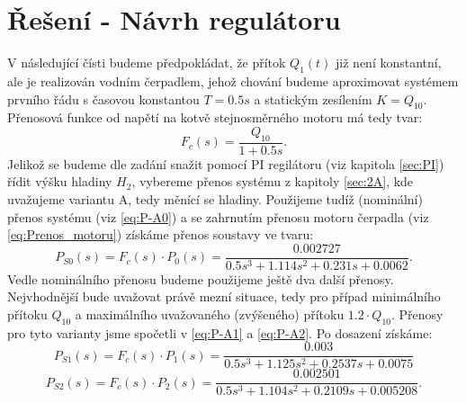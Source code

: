 \documentclass[a4paper,11pt]{article}
\begin{document}
\section{Řešení - Návrh regulátoru}
V následující čísti budeme předpokládat, že přítok $ Q_{1}\left ( t \right ) $ již není konstantní, ale je realizován vodním čerpadlem, jehož chování budeme aproximovat systémem prvního řádu s časovou konstantou $ T=0.5s $ a statickým zesílením $ K = Q_{10} $. 
Přenosová funkce od napětí na kotvě stejnosměrného motoru má tedy tvar:
\begin{equation}\label{eq:Prenos_motoru} 
F_{c}\left ( s \right )=\frac{Q_{10}}{1+0.5s}.
\end{equation}
Jelikož se budeme dle zadání snažit pomocí PI regilátoru (viz kapitola \ref{sec:PI}) řídit výšku hladiny $ H_{2} $, vybereme přenos systému z kapitoly \ref{sec:2A}, kde uvažujeme variantu A, tedy měnící se hladiny. Použijeme tudíž (nominální) přenos systému (viz \ref{eq:P-A0}) a se zahrnutím přenosu motoru čerpadla (viz \ref{eq:Prenos_motoru}) získáme přenos soustavy ve tvaru:
\begin{equation}\label{eq:Prenos_soustavy_s_motorem-nominalni} 
P_{S0}\left ( s \right )=F_{c}\left ( s \right )\cdot P_{0}\left ( s \right )=\frac{0.002727}{0.5 s^{3} + 1.114 s^{2} + 0.231 s + 0.0062}.
\end{equation}
Vedle nominálního přenosu budeme použijeme ještě dva další přenosy. Nejvhodnější bude uvažovat právě mezní situace, tedy pro případ minimálního přítoku $ Q_{10} $ a maximálního uvažovaného (zvýšeného) přítoku $ 1.2\cdot Q_{10} $. Přenosy pro tyto varianty jsme spočetli v \ref{eq:P-A1} a \ref{eq:P-A2}. Po dosazení získáme:
\begin{equation}\label{eq:Prenos_soustavy_s_motorem-min} 
P_{S1}\left ( s \right )=F_{c}\left ( s \right )\cdot P_{1}\left ( s \right )=\frac{0.003}{ 0.5 s^3 + 1.125 s^2 + 0.2537 s + 0.0075}
\end{equation}
\begin{equation}\label{eq:Prenos_soustavy_s_motorem-max} 
P_{S2}\left ( s \right )=F_{c}\left ( s \right )\cdot P_{2}\left ( s \right )=\frac{0.002501}{0.5 s^3 + 1.104 s^2 + 0.2109 s + 0.005208}.
\end{equation}
\end{document}
